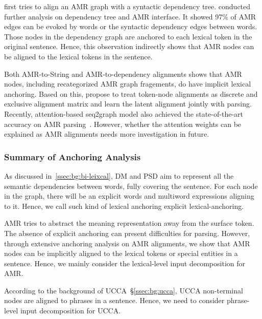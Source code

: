  \citet{chen2017unsupervised}
first tries to align an AMR graph with a syntactic dependency tree.
\citet{szubert2018structured} conducted further analysis on dependency
tree and AMR interface. It showed 97\% of AMR edges can be evoked by
words or the syntactic dependency edges between words.  Those nodes in
the dependency graph are anchored to each lexical token in the
original sentence. Hence, this observation indirectly shows that AMR
nodes can be aligned to the lexical tokens in the sentence.

Both AMR-to-String and AMR-to-dependency alignments shows that AMR
nodes, including recategorized AMR graph fragements, do have implicit
lexical anchoring. Based on this, \citet{lyu2018amr} propose to treat
token-node alignments as discrete and exclusive alignment matrix and
learn the latent alignment jointly with parsing. Recently,
attention-based seq2graph model also achieved the state-of-the-art
accuracy on AMR parsing~\cite{zhang-etal-2018-stog}.  However, whether
the attention weights can be explained as AMR alignments needs more
investigation in future.

\subsubsection{Summary of Anchoring Analysis}

As discussed in~\autoref{ssec:bg:bi-leixcal}, DM and PSD aim to
represent all the semantic dependencies between words, fully
covering the sentence. For each node in the graph, there will be an
explicit words and multiword expressions aligning to it. Hence, we call such
kind of lexical anchoring explicit lexical-anchoring.

AMR tries to abstract the meaning representation away from the surface
token. The absence of explicit anchoring can present difficulties for
parsing. However, through extensive anchoring analysis on AMR
alignments, we show that AMR nodes can be implicitly aligned to the
lexical tokens or special entities in a sentence. Hence, we mainly
consider the lexical-level input decomposition for AMR.

 According to the
background of UCCA~\S\ref{ssec:bg:ucca}, UCCA non-terminal nodes are
aligned to phrases in a sentence. Hence, we need to consider
phrase-level input decomposition for UCCA.

